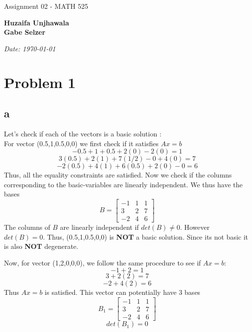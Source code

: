 \documentclass[11pt]{article}
\begin{document}
\begin{titlepage}
    \centering
    \vspace*{0.5cm}
    \par\normalfont\fontsize{35}{35}\sffamily\selectfont
    Assignment 02 - MATH 525\par 
    \vspace*{1cm}
    {\huge\bfseries Huzaifa Unjhawala \\  Gabe Selzer \par} 
    \vspace*{1cm}
    {\Large\itshape Date: \today\par} 
    \vfill
\end{titlepage}

\tableofcontents
\newpage

\section*{Problem 1}
\subsection*{a} Let's check if each of the vectors is a basic solution : \\
For vector (0.5,1,0.5,0,0) we first check if it satisfies $Ax = b$ \\
\[-0.5 + 1 + 0.5 + 2(0) - 2(0) = 1\]
\[3(0.5) + 2(1) + 7(1/2) - 0 +4(0) = 7\]
\[-2(0.5) + 4(1) +6(0.5) +2(0) - 0 = 6\]
Thus, all the equality constraints are satisfied. Now we check if the columns corresponding to the basic-variables are linearly independent. We thus have the bases 
\[B  =  \begin{bmatrix}
-1 & 1 & 1  \\
3 & 2 & 7 \\
-2 & 4 & 6 
\end{bmatrix}\]
The columns of $B$ are linearly independent if $det(B) \ne 0$. However $det(B) = 0$. Thus, (0.5,1,0.5,0,0) is \textbf{NOT} a basic solution. Since its not basic it is also \textbf{NOT} degenerate.

Now, for vector (1,2,0,0,0), we follow the same procedure to see if $Ax = b$:\\
\[-1 + 2 = 1\]
\[3 + 2(2) = 7\]
\[-2 + 4(2) = 6\]
Thus $Ax = b$ is satisfied. This vector can potentially have 3 bases
\[B_1  =  \begin{bmatrix}
    -1 & 1 & 1  \\
    3 & 2 & 7 \\
    -2 & 4 & 6 
    \end{bmatrix}\]
\[det(B_1) = 0\]
\end{document}
